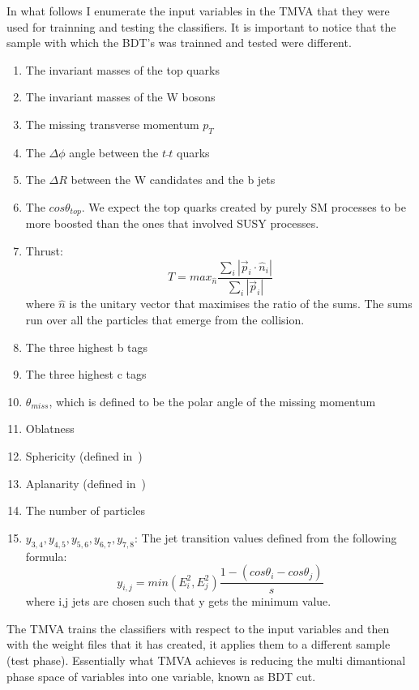 \documentclass[12pt,a4paper]{report}
\begin{document}
In what follows I enumerate the input variables in the TMVA that they were used for trainning and testing 
the classifiers. It is important to notice that the sample with which the BDT's was trainned and tested were
different.

\begin{enumerate}
 \item The invariant masses of the top quarks
 \item The invariant masses of the W bosons
 \item The missing transverse momentum  $p_{T}$
 \item The $\Delta \phi$ angle between the $t\bar{}t$ quarks
 \item The $\Delta R$  between the W candidates and the b jets
 \item The $cos\theta_{top}$. We expect the top quarks created by purely SM processes to be more boosted 
 than the ones that involved SUSY processes.
 \item Thrust: 
 \begin{equation}
  T=max_{\hat{n}}\frac{\sum_{i}^{}|\vec{p}_{i}\cdot \hat{n}_{i}|}{\sum_{i}^{}|\vec{p}_{i}|}
 \end{equation}
	where $\hat{n}$ is the unitary vector that maximises the ratio of the sums. The sums run over all the
	particles that emerge from the collision.

	
  \item The three highest b tags
  \item The three highest c tags
  \item $\theta_{miss}$, which is defined to be the polar angle of the missing momentum
  \item Oblatness
  \item Sphericity (defined in~\cite{chen2012new})
  \item Aplanarity (defined in~\cite{chen2012new})
  \item The number of particles
  \item $y_{3,4},y_{4,5},y_{5,6},y_{6,7},y_{7,8}$: The jet transition values defined from the following 
  formula:
  \begin{equation}
   y_{i,j}=min(E_{i}^{2},E_{j}^{2})\frac{1-(cos\theta_{i}-cos\theta_{j})}{s}
  \end{equation}
  where i,j jets are chosen such that y gets the minimum value. 
\end{enumerate}  

\newpage

The TMVA trains the classifiers with respect to the input variables and then with the weight files that it has
created, it applies them to a different sample (test phase). Essentially what TMVA achieves is reducing the 
multi dimantional phase space of variables into one variable, known as BDT cut.
\end{document}
